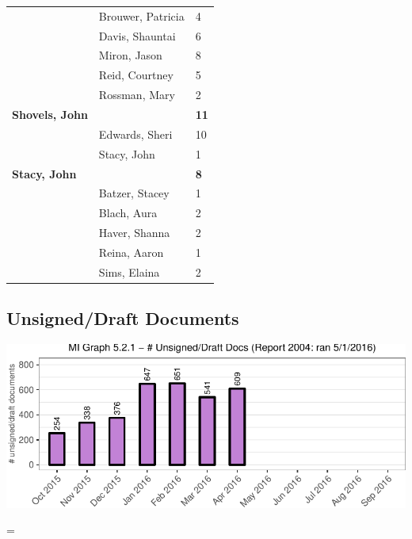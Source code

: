 \documentclass{article}\usepackage[]{graphicx}\usepackage[]{color}
\makeatletter
\def\maxwidth{ %
  \ifdim\Gin@nat@width>\linewidth
    \linewidth
  \else
    \Gin@nat@width
  \fi
}
\newenvironment{knitrout}{}{} %
\newenvironment{absolutelynopagebreak}
  {\par\nobreak\vfil\penalty0\vfilneg
   \vtop\bgroup}
  {\par\xdef\tpd{\the\prevdepth}\egroup
   \prevdepth=\tpd}
\makeatother
\begin{document}
\begin{longtable} { >{\raggedright}p{}|p{}p{}}
   & Brouwer, Patricia & 4 \\ 
   & Davis, Shauntai & 6 \\ 
   & Miron, Jason & 8 \\ 
   \rowcolor[gray]{0.90} & Reid, Courtney & 5 \\ 
   \rowcolor[gray]{0.90} & Rossman, Mary & 2 \\ 
   \rowcolor[gray]{0.90}\textbf{Shovels, John} &  & \hspace{2cm}\textbf{\textbf{11}} \\ 
   & Edwards, Sheri & 10 \\ 
   & Stacy, John & 1 \\ 
  \textbf{Stacy, John} &  & \hspace{2cm}\textbf{\textbf{8}} \\ 
   \rowcolor[gray]{0.90} & Batzer, Stacey & 1 \\ 
   \rowcolor[gray]{0.90} & Blach, Aura & 2 \\ 
   \rowcolor[gray]{0.90} & Haver, Shanna & 2 \\ 
   & Reina, Aaron & 1 \\ 
   & Sims, Elaina & 2 \\ 
   \end{longtable}


\begin{absolutelynopagebreak}
\subsection{Unsigned/Draft Documents}
\begin{knitrout}
\color{fgcolor}
\includegraphics[width=\maxwidth]{figure/mi_p_unsign-1} 

\end{knitrout}
\end{absolutelynopagebreak}

\end{document}
